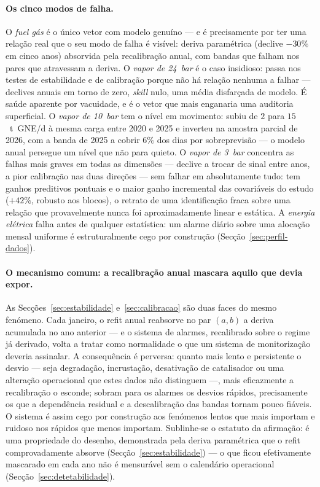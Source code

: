 \paragraph{Os cinco modos de falha.} O \emph{fuel gás} é o único vetor com
modelo genuíno --- e é precisamente por ter uma relação real que o seu
modo de falha é visível: deriva paramétrica (declive $-30\%$ em cinco anos)
absorvida pela recalibração anual, com bandas que falham nos pares que
atravessam a deriva. O \emph{vapor de 24~bar} é o caso insidioso: passa nos
testes de estabilidade e de calibração porque não há relação nenhuma a
falhar --- declives anuais em torno de zero, \emph{skill} nulo, uma média
disfarçada de modelo. É saúde aparente por vacuidade, e é o vetor que mais
enganaria uma auditoria superficial. O \emph{vapor de 10~bar} tem o nível em
movimento: subiu de $2$ para $15$~t~GNE/d à mesma carga entre 2020 e 2025 e
inverteu na amostra parcial de 2026, com a banda de 2025 a cobrir $6\%$ dos
dias por sobreprevisão --- o modelo anual persegue um nível que não para
quieto. O
\emph{vapor de 3~bar} concentra as falhas mais graves em todas as dimensões
--- declive a trocar de sinal entre anos, a pior calibração nas duas direções
--- sem falhar em absolutamente tudo: tem ganhos preditivos pontuais e o maior
ganho incremental das covariáveis do estudo ($+42\%$, robusto aos blocos), o retrato de uma
identificação fraca sobre uma relação que provavelmente nunca foi
aproximadamente linear e estática. A
\emph{energia elétrica} falha antes de qualquer estatística: um alarme
diário sobre uma alocação mensal uniforme é estruturalmente cego por
construção (Secção~\ref{sec:perfil-dados}).

\paragraph{O mecanismo comum: a recalibração anual mascara aquilo que devia
expor.} As Secções~\ref{sec:estabilidade} e~\ref{sec:calibracao} são
duas faces do mesmo fenómeno. Cada janeiro, o refit anual reabsorve no par
$(a,b)$ a deriva acumulada no ano anterior --- e o sistema de alarmes,
recalibrado sobre o regime já derivado, volta a tratar como normalidade o
que um sistema de monitorização deveria assinalar. A consequência é
perversa: quanto mais lento e persistente o desvio --- seja degradação,
incrustação, desativação de catalisador ou uma alteração operacional que
estes dados não distinguem ---, mais eficazmente a recalibração o esconde; sobram para os
alarmes os desvios rápidos, precisamente os que a dependência residual e a
descalibração das bandas tornam pouco fiáveis. O sistema é assim cego por
construção aos fenómenos lentos que mais importam e ruidoso nos rápidos que
menos importam. Sublinhe-se o estatuto da afirmação: é uma propriedade do
desenho, demonstrada pela deriva paramétrica que o refit comprovadamente
absorve (Secção~\ref{sec:estabilidade}) --- o que ficou efetivamente
mascarado em cada ano não é mensurável sem o calendário operacional
(Secção~\ref{sec:detetabilidade}).

